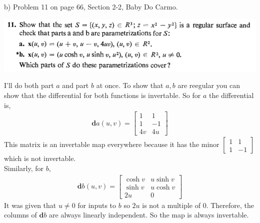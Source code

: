 \documentclass[10pt,letterpaper]{hmcpset}
\begin{document}
\newpage \begin{problem}
b) Problem 11 on page 66, Section 2-2, Baby Do Carmo.

\includegraphics[scale=0.7]{Cb.png}
\end{problem}
\begin{solution}

I'll do both part $a$ and part $b$ at once.
To show that $a, b$ are reegular you can show that the differential for both
functions is invertable. So for $a$  the differential is,
\begin{align*}
  \mathbf{d}a(u, v) = \begin{bmatrix}
    1 & 1 \\
    1 & -1 \\
    4v & 4u
  \end{bmatrix}
\end{align*}
This matrix is an invertable map everywhere because it has the minor 
$\begin{bmatrix}1&1\\1&-1\end{bmatrix}$ which is  not invertable. \\
Similarly, for $b$,
\begin{align*}
  \mathbf{d}b(u, v) = \begin{bmatrix}
    \cosh v & u \sinh v \\
    \sinh v & u \cosh v \\
    2u & 0 
  \end{bmatrix}
\end{align*}
It was given that $u \neq 0$ for inputs to $b$ so $2u$ is not a multiple of $0$.
Therefore, the columns of $\mathbf{d}b$ are always linearly independent. So
the map is always invertable. \\


\end{solution}
\end{document}
